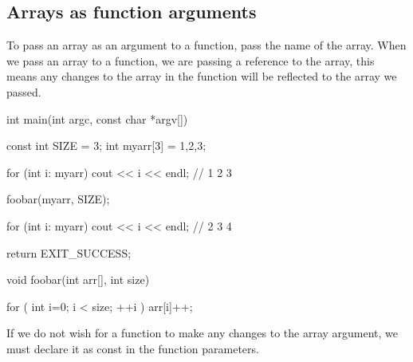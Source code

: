 \documentclass{report}
\begin{document}
    \bigbreak \noindent 

    \bigbreak \noindent 
    \subsection{Arrays as function arguments}
    \bigbreak \noindent 
    \begin{concept}
  To pass an array as an argument to a function, pass the name of the array. When we pass an array to a function, we are passing a reference to the array, this means any changes to the array in the function will be reflected to the array we passed.
	\end{concept}
    \bigbreak \noindent 
    
    \begin{cppcode}
int main(int argc, const char *argv[]) {

    const int SIZE = 3;
    int myarr[3] = {1,2,3};

    for (int i: myarr) cout << i << endl; // 1 2 3

    foobar(myarr, SIZE);

    for (int i: myarr) cout << i << endl; // 2 3 4



    return EXIT_SUCCESS;
}

void foobar(int arr[], int size) {

    for ( int i=0; i < size; ++i ) {
        arr[i]++;
    }


}
    \end{cppcode}
    

    \bigbreak \noindent 
    \begin{notebox}
			If we do not wish for a function to make any changes to the array argument, we must declare it as const in the function parameters.
		\end{notebox}

    \pagebreak \bigbreak \noindent 
\end{document}
